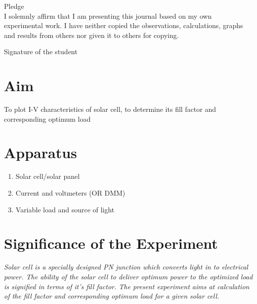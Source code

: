 \documentclass[12pt]{article}
\begin{document}
	\begin{center}
	{\Large Pledge}\\
	\vspace{0.5cm}
	I solemnly affirm that I am presenting this journal based on my own experimental work. I have neither copied the observations, calculations, graphs and results from others nor given it to others for copying.\\
		\end{center}
	
	\vspace{0.5cm}
	
    \begin{flushright}
	{\large Signature of the student}\\
	\vspace{1cm}
	 \end{flushright}
	
	\section{Aim}
	\noindent
	To plot I-V characteristics of solar cell, to determine its fill factor and corresponding
	optimum load
	
\section{Apparatus}


		\begin{enumerate}
			\item Solar cell/solar panel
			\item Current and voltmeters (OR DMM)
			\item Variable load and source of light
		\end{enumerate}

\section{Significance of the Experiment}
	\textit{Solar cell is a specially designed PN junction which converts
	light in to electrical power. The ability of the solar cell to deliver optimum power to the
	optimized load is signified in terms of it’s fill factor. The present experiment aims at calculation
	of the fill factor and corresponding optimum load for a given solar cell.}
	
\end{document}
